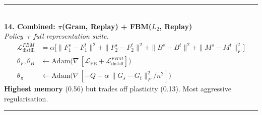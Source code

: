 \documentclass[10pt]{article}
\newcommand{\loss}{\mathcal{L}}
\newcommand{\method}[2]{%
  \noindent\rule{\textwidth}{0.5pt}\\[2pt]
  {\large\textbf{#1}}\\[2pt]
  \textit{#2}\\[4pt]
}
\begin{document}
\method{14. Combined: $\pi$(Gram, Replay) + FBM($L_2$, Replay)}{Policy + full representation suite.}
\vspace{-0.5em}
\begin{align*}
\loss_{\text{distill}}^{FBM} &= \alpha\bigl[\|F_1^s{-}F_1^t\|^2 + \|F_2^s{-}F_2^t\|^2 + \|B^s{-}B^t\|^2 + \|M^s{-}M^t\|_F^2\bigr]\\
\theta_F, \theta_B &\leftarrow \mathrm{Adam}\bigl(\nabla\,[\loss_{\text{FB}} + \loss_{\text{distill}}^{FBM}]\bigr)\\
\theta_\pi &\leftarrow \mathrm{Adam}\bigl(\nabla\,[-Q + \alpha\,\|G_s - G_t\|_F^2/n^2]\bigr)
\end{align*}
\textbf{Highest memory} (0.56) but trades off plasticity (0.13). Most aggressive regularisation.

\noindent\rule{\textwidth}{0.5pt}
\end{document}
